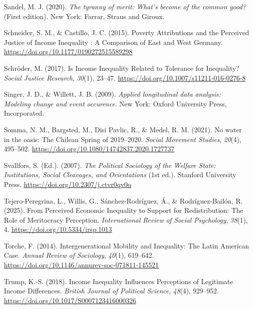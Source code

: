 \documentclass[
  12pt,
]{article}
\newlength{\cslhangindent}
\newenvironment{CSLReferences}[2] %
 {\begin{list}{}{%
  \setlength{\itemindent}{0pt}
  \setlength{\leftmargin}{0pt}
  \setlength{\parsep}{0pt}
  \ifodd #1
   \setlength{\leftmargin}{\cslhangindent}
   \setlength{\itemindent}{-1\cslhangindent}
  \fi
  \setlength{\itemsep}{#2\baselineskip}}}
 {\end{list}}
\begin{document}
\begin{CSLReferences}{1}{0}
Sandel, M. J. (2020). \emph{The tyranny of merit: {What}'s become of the
common good?} (First edition). New York: {Farrar, Straus and Giroux}.

Schneider, S. M., \& Castillo, J. C. (2015). Poverty {Attributions} and
the {Perceived Justice} of {Income Inequality} : {A Comparison} of
{East} and {West Germany}.
\url{https://doi.org/10.1177/0190272515589298}

Schröder, M. (2017). Is {Income Inequality Related} to {Tolerance} for
{Inequality}? \emph{Social Justice Research}, \emph{30}(1), 23--47.
\url{https://doi.org/10.1007/s11211-016-0276-8}

Singer, J. D., \& Willett, J. B. (2009). \emph{Applied longitudinal data
analysis: Modeling change and event occurence}. New York: Oxford
University Press, Incorporated.

Somma, N. M., Bargsted, M., Disi Pavlic, R., \& Medel, R. M. (2021). No
water in the oasis: The {Chilean Spring} of 2019--2020. \emph{Social
Movement Studies}, \emph{20}(4), 495--502.
\url{https://doi.org/10.1080/14742837.2020.1727737}

Svallfors, S. (Ed.). (2007). \emph{The {Political Sociology} of the
{Welfare State}: {Institutions}, {Social Cleavages}, and {Orientations}}
(1st ed.). Stanford University Press.
\url{https://doi.org/10.2307/j.ctvr0qv0q}

Tejero-Peregrina, L., Willis, G., Sánchez-Rodríguez, Á., \&
Rodríguez-Bailón, R. (2025). From {Perceived Economic Inequality} to
{Support} for {Redistribution}: {The Role} of {Meritocracy Perception}.
\emph{International Review of Social Psychology}, \emph{38}(1), 4.
\url{https://doi.org/10.5334/irsp.1013}

Torche, F. (2014). Intergenerational {Mobility} and {Inequality}: {The
Latin American Case}. \emph{Annual Review of Sociology}, \emph{40}(1),
619--642. \url{https://doi.org/10.1146/annurev-soc-071811-145521}

Trump, K.-S. (2018). Income {Inequality Influences Perceptions} of
{Legitimate Income Differences}. \emph{British Journal of Political
Science}, \emph{48}(4), 929--952.
\url{https://doi.org/10.1017/S0007123416000326}


\end{CSLReferences}
\end{document}
